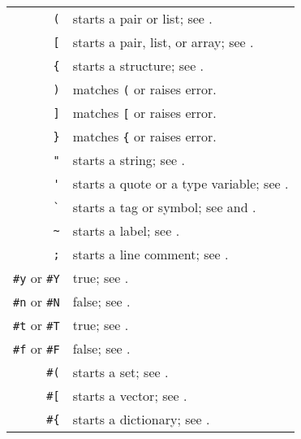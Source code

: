 \begin{table}
\begin{longtable}{ r l }
  \lstinline!(! & starts a pair or list; see \nameref{subsec:aml-base-lang-reader-lists}. \\
  \lstinline![! & starts a pair, list, or array; see \nameref{subsec:aml-base-lang-reader-lists}. \\
  \lstinline!{! & starts a structure; see \nameref{subsec:aml-base-lang-reader-structures}. \\
  \lstinline!)! & matches \lstinline!(! or raises error. \\
  \lstinline!]! & matches \lstinline![! or raises error. \\
  \lstinline!}! & matches \lstinline!{! or raises error. \\
  
\pagebreak[2]
  \lstinline!"! & starts a string; see \nameref{subsec:aml-base-lang-reader-strings}. \\
  \lstinline!'! & starts a quote or a type variable; see \nameref{subsec:aml-base-lang-reader-quotes}. \\
  \lstinline!`! & starts a tag or symbol; see \nameref{subsec:aml-base-lang-reader-polytags} and \nameref{subsec:aml-base-lang-reader-symbols}. \\
  \lstinline!~! & starts a label; see \nameref{subsec:aml-base-lang-reader-labels}. \\
  \lstinline!;! & starts a line comment; see \nameref{subsec:aml-base-lang-reader-comments}. \\
  
\pagebreak[2]
  \lstinline!#y! or \lstinline!#Y! & true; see \nameref{subsec:aml-base-lang-reader-booleans}. \\
  \lstinline!#n! or \lstinline!#N! & false; see \nameref{subsec:aml-base-lang-reader-booleans}. \\
  \lstinline!#t! or \lstinline!#T! & true; see \nameref{subsec:aml-base-lang-reader-booleans}. \\
  \lstinline!#f! or \lstinline!#F! & false; see \nameref{subsec:aml-base-lang-reader-booleans}. \\  
  
  \lstinline!#(! & starts a set; see \nameref{subsec:aml-base-lang-reader-sets}. \\
  \lstinline!#[! & starts a vector; see \nameref{subsec:aml-base-lang-reader-vectors}. \\
  \lstinline!#{! & starts a dictionary; see \nameref{subsec:aml-base-lang-reader-dictionaries}. \\
  

\end{longtable}
\end{table}
